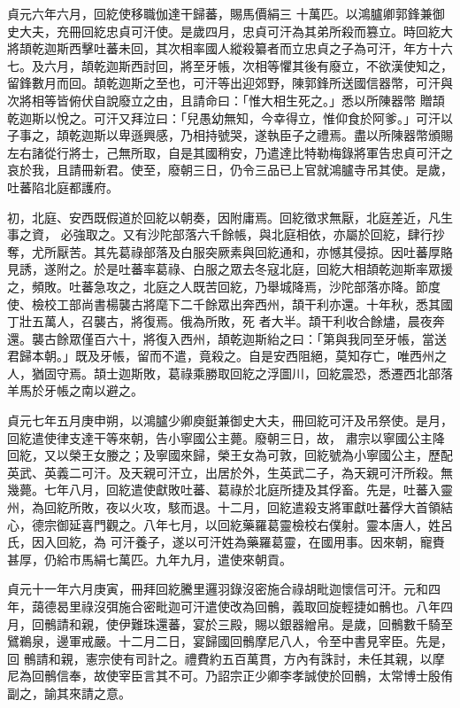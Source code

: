 \begin{pinyinscope}
 貞元六年六月，回紇使移職伽達干歸蕃，賜馬價絹三
 十萬匹。以鴻臚卿郭鋒兼御史大夫，充冊回紇忠貞可汗使。是歲四月，忠貞可汗為其弟所殺而篡立。時回紇大將頡乾迦斯西擊吐蕃未回，其次相率國人縱殺纂者而立忠貞之子為可汗，年方十六七。及六月，頡乾迦斯西討回，將至牙帳，次相等懼其後有廢立，不欲漢使知之，留鋒數月而回。頡乾迦斯之至也，可汗等出迎郊野，陳郭鋒所送國信器幣，可汗與次將相等皆俯伏自說廢立之由，且請命曰：「惟大相生死之。」悉以所陳器幣
 贈頡乾迦斯以悅之。可汗又拜泣曰：「兒愚幼無知，今幸得立，惟仰食於阿爹。」可汗以子事之，頡乾迦斯以卑遜興感，乃相持號哭，遂執臣子之禮焉。盡以所陳器幣頒賜左右諸從行將士，己無所取，自是其國稍安，乃遣達比特勒梅錄將軍告忠貞可汗之哀於我，且請冊新君。使至，廢朝三日，仍令三品已上官就鴻臚寺吊其使。是歲，吐蕃陷北庭都護府。



 初，北庭、安西既假道於回紇以朝奏，因附庸焉。回紇徵求無厭，北庭差近，凡生事之資，
 必強取之。又有沙陀部落六千餘帳，與北庭相依，亦屬於回紇，肆行抄奪，尤所厭苦。其先葛祿部落及白服突厥素與回紇通和，亦憾其侵掠。因吐蕃厚賂見誘，遂附之。於是吐蕃率葛祿、白服之眾去冬寇北庭，回紇大相頡乾迦斯率眾援之，頻敗。吐蕃急攻之，北庭之人既苦回紇，乃舉城降焉，沙陀部落亦降。節度使、檢校工部尚書楊襲古將麾下二千餘眾出奔西州，頡干利亦還。十年秋，悉其國丁壯五萬人，召襲古，將復焉。俄為所敗，死
 者大半。頡干利收合餘燼，晨夜奔還。襲古餘眾僅百六十，將復入西州，頡乾迦斯紿之曰：「第與我同至牙帳，當送君歸本朝。」既及牙帳，留而不遣，竟殺之。自是安西阻絕，莫知存亡，唯西州之人，猶固守焉。頡士迦斯敗，葛祿乘勝取回紇之浮圖川，回紇震恐，悉遷西北部落羊馬於牙帳之南以避之。



 貞元七年五月庚申朔，以鴻臚少卿庾鋌兼御史大夫，冊回紇可汗及吊祭使。是月，回紇遣使律支達干等來朝，告小寧國公主薨。廢朝三日，故，
 肅宗以寧國公主降回紇，又以榮王女媵之；及寧國來歸，榮王女為可敦，回紇號為小寧國公主，歷配英武、英義二可汗。及天親可汗立，出居於外，生英武二子，為天親可汗所殺。無幾薨。七年八月，回紇遣使獻敗吐蕃、葛祿於北庭所捷及其俘畜。先是，吐蕃入靈州，為回紇所敗，夜以火攻，駭而退。十二月，回紇遣殺支將軍獻吐蕃俘大首領結心，德宗御延喜門觀之。八年七月，以回紇藥羅葛靈檢校右僕射。靈本唐人，姓呂氏，因入回紇，為
 可汗養子，遂以可汗姓為藥羅葛靈，在國用事。因來朝，寵賚甚厚，仍給市馬絹七萬匹。九年九月，遣使來朝貢。



 貞元十一年六月庚寅，冊拜回紇騰里邏羽錄沒密施合祿胡毗迦懷信可汗。元和四年，藹德曷里祿沒弭施合密毗迦可汗遣使改為回鶻，義取回旋輕捷如鶻也。八年四月，回鶻請和親，使伊難珠還蕃，宴於三殿，賜以銀器繒帛。是歲，回鶻數千騎至鷿鵜泉，邊軍戒嚴。十二月二日，宴歸國回鶻摩尼八人，令至中書見宰臣。先是，回
 鶻請和親，憲宗使有司計之。禮費約五百萬貫，方內有誅討，未任其親，以摩尼為回鶻信奉，故使宰臣言其不可。乃詔宗正少卿李孝誠使於回鶻，太常博士殷侑副之，諭其來請之意。




\end{pinyinscope}
